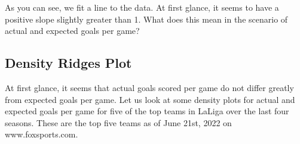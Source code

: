 \documentclass[
  11pt,
]{book}
\theoremstyle{definition}
\theoremstyle{definition}
\theoremstyle{definition}
\theoremstyle{definition}
\theoremstyle{remark}
\begin{document}
As you can see, we fit a line to the data. At first glance, it seems to have a positive slope slightly greater than 1. What does this mean in the scenario of actual and expected goals per game?

\hypertarget{density-ridges-plot}{%
\subsection{Density Ridges Plot}\label{density-ridges-plot}}

At first glance, it seems that actual goals scored per game do not differ greatly from expected goals per game. Let us look at some density plots for actual and expected goals per game for five of the top teams in LaLiga over the last four seasons. These are the top five teams as of June 21st, 2022 on www.foxsports.com.
\end{document}
